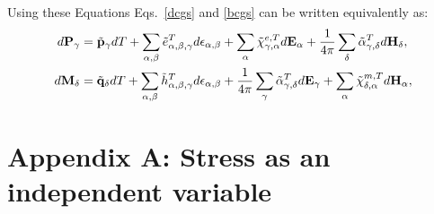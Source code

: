 \documentclass[12pt,a4paper]{article}
\begin{document}
{Using these Equations Eqs.~\ref{dcgs} and \ref{bcgs} can be written
equivalently as:
\begin{align}
d{\bf P}_\gamma&=
\tilde {\bf p}_\gamma dT + \sum_{\alpha,\beta} \tilde 
e^T_{\alpha,\beta,\gamma} d\epsilon_{\alpha,\beta}
+ \sum_\alpha \tilde \chi^{e,T}_{\gamma,\alpha} 
d{\bf E}_{\alpha} + {1\over 4 \pi}
\sum_\delta \tilde \alpha^T_{\gamma,\delta} d{\bf H}_{\delta}, \\
d{\bf M}_\delta&= \tilde {\bf q}_\delta dT+ \sum_{\alpha,\beta}
\tilde h^T_{\alpha,\beta,\gamma}
d\epsilon_{\alpha,\beta}
+{1\over 4 \pi} \sum_\gamma \tilde \alpha^T_{\gamma,\delta}
d{\bf E}_{\gamma}+ 
\sum_\alpha \tilde \chi^{m,T}_{\delta,\alpha}
d{\bf H}_{\alpha}, 
\end{align}
}

\newpage

\section{\color{coral} Appendix A: Stress as an independent variable}
\end{document}
